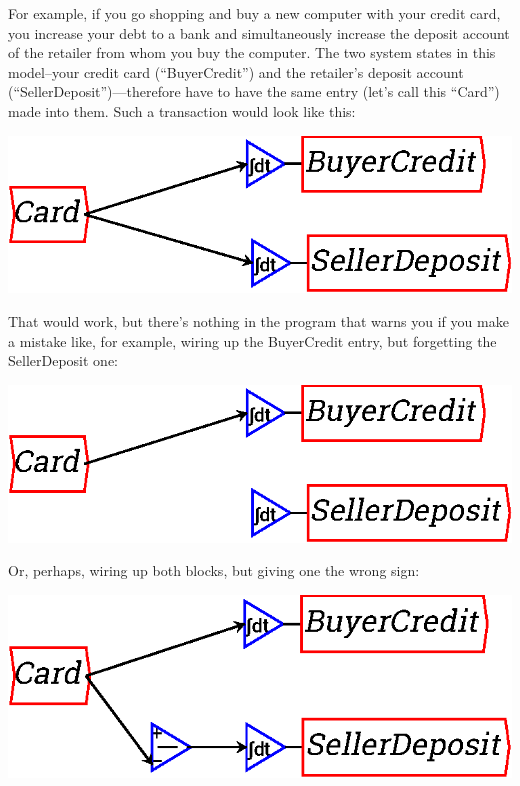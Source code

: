For example, if you go shopping and buy a new computer with your
credit card, you increase your debt to a bank and simultaneously
increase the deposit account of the retailer from whom you buy the
computer. The two system states in this model--your credit card
(``BuyerCredit'') and the retailer's deposit account
(``SellerDeposit'')---therefore have to have the same entry (let's call
this ``Card'') made into them. Such a transaction would look
like this:


\begin{center}
\includegraphics{images/NewItem11.eps}
\end{center}

That would work, but there's nothing in the program that warns you if
you make a mistake like, for example, wiring up the BuyerCredit entry,
but forgetting the SellerDeposit one:

\begin{center}
\includegraphics{images/NewItem12.eps}
\end{center}

Or, perhaps, wiring up both blocks, but giving one the wrong sign:

\begin{center}
\includegraphics{images/NewItem51.eps}
\end{center}

